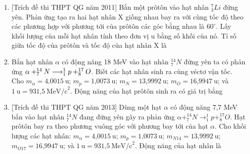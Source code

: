 \begin{enumerate}
{	}
	\item {[Trích đề thi THPT QG năm 2011] Bắn một prôtôn vào hạt nhân $^7_3Li$ đứng yên. Phản ứng tạo ra hai hạt nhân X giống nhau bay ra với cùng tốc độ theo các phương hợp với phương tới của prôtôn các góc bằng nhau là $60^\circ$. Lấy khối lượng của mỗi hạt nhân tính theo đơn vị u bằng số khối của nó. Tỉ số giữa tốc độ của prôtôn và tốc độ của hạt nhân X là
	}
	\item {Bắn hạt nhân $\alpha$ có động năng 18 MeV vào hạt nhân $^{14}_7 N$ đứng yên ta có phản ứng $\\ \alpha + ^{14}_7 N \longrightarrow ^1_1p + ^{17}_8 O$. Biết các hạt nhân sinh ra cùng véctơ vận tốc. Cho $m_{\alpha} = \text{4,0015}\ \text{u}$; $m_p=\text{1,0073}\ \text{u}$; $m_{N}=\text{13,9992}\ \text{u}$; $m_{O}=\text{16,9947}\ \text{u}$; và $1\ \text{u} = \text{931,5}\ \text{MeV/c}^2$. Động năng của hạt prôtôn sinh ra có giá trị bằng
	}
	\item {[Trích đề thi THPT QG năm 2013] Dùng một hạt $\alpha$ có động năng 7,7 MeV bắn vào hạt nhân $^{14}_7N$ đang đứng yên gây ra phản ứng $\alpha + ^{14}_7 N \longrightarrow ^1_1p + ^{17}_8 O$. Hạt prôtôn bay ra theo phương vuông góc với phương bay tới của hạt $\alpha$. Cho khối lượng các hạt nhân: $m_{\alpha} = \text{4,0015}\ \text{u}$; $m_p=\text{1,0073}\ \text{u}$; $m_{N14}=\text{13,9992}\ \text{u}$; $m_{O17}=\text{16,9947}\ \text{u}$; và $1\ \text{u} = \text{931,5}\ \text{MeV/c}^2$. Động năng của hạt nhân là
	}
\end{enumerate}
